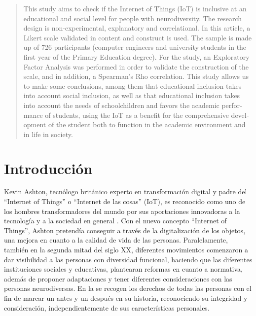 \documentclass[spanish]{textolivre}
\begin{document}
\begin{polyabstract}
\begin{portuguese}
\begin{abstract}
\end{abstract}
\end{portuguese}

\begin{english}
\begin{abstract}
This study aims to check if the Internet of Things (IoT) is inclusive at an educational and social level for people with neurodiversity. The research design is non-experimental, explanatory and correlational. In this article, a Likert scale validated in content and construct is used. The sample is made up of 726 participants (computer engineers and university students in the first year of the Primary Education degree). For the study, an Exploratory Factor Analysis was performed in order to validate the construction of the scale, and in addition, a Spearman's Rho correlation. This study allows us to make some conclusions, among them that educational inclusion takes into account social inclusion, as well as that educational inclusion takes into account the needs of schoolchildren and favors the academic performance of students, using the IoT as a benefit for the comprehensive development of the student both to function in the academic environment and in life in society.

\end{abstract}
\end{english}
\end{polyabstract}

\section{Introducción}

Kevin Ashton, tecnólogo británico experto en transformación digital y padre del “Internet of Things” o “Internet de las cosas” (IoT), es reconocido como uno de los hombres transformadores del mundo por sus aportaciones innovadoras a la tecnología y a la sociedad en general \cite{fernandez_kevin_2018}. Con el nuevo concepto “Internet of Things”, Ashton pretendía conseguir a través de la digitalización de los objetos, una mejora en cuanto a la calidad de vida de las personas. Paralelamente, también en la segunda mitad del siglo XX, diferentes movimientos comenzaron a dar visibilidad a las personas con diversidad funcional, haciendo que las diferentes instituciones sociales y educativas, plantearan reformas en cuanto a normativa, además de proponer adaptaciones y tener diferentes consideraciones con las personas neurodiversas. En la \textcite{declaracion_universal_de_los_derechos_humanos_convencion_1950} se recogen los derechos de todas las personas con el fin de marcar un antes y un después en su historia, reconociendo su integridad y consideración, independientemente de sus características personales.
\end{document}
